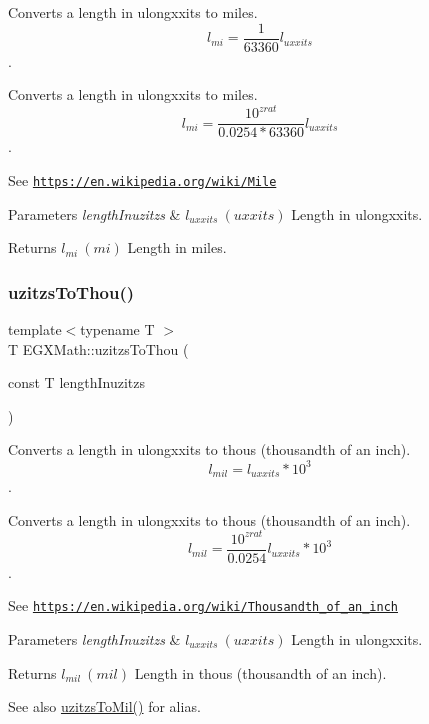 Converts a length in ulongxxits to miles. \[ l_{mi}=\frac{1}{63360} l_{uxxits} \]. 

Converts a length in ulongxxits to miles. \[ l_{mi}=\frac{10^{zrat}}{0.0254 * 63360} l_{uxxits} \].

See \href{https://en.wikipedia.org/wiki/Mile}{\tt https\+://en.\+wikipedia.\+org/wiki/\+Mile} 
\begin{DoxyParams}{Parameters}
{\em length\+Inuzitzs} & $ l_{uxxits}\ (uxxits)$ Length in ulongxxits. \\
\hline
\end{DoxyParams}
\begin{DoxyReturn}{Returns}
$ l_{mi}\ (mi)$ Length in miles. 
\end{DoxyReturn}
\mbox{\label{group___e_g_x_math-_conversions-_length_conversions-uzitzs-_imperial_gaa11694f9026bf30e29bd716a35c05b4e}} 
\subsubsection{\texorpdfstring{uzitzs\+To\+Thou()}{uzitzsToThou()}}
{\footnotesize\ttfamily template$<$typename T $>$ \\
T E\+G\+X\+Math\+::uzitzs\+To\+Thou (\begin{DoxyParamCaption}\item[{const T}]{length\+Inuzitzs }\end{DoxyParamCaption})}



Converts a length in ulongxxits to thous (thousandth of an inch). \[ l_{mil}=l_{uxxits} * 10^{3} \]. 

Converts a length in ulongxxits to thous (thousandth of an inch). \[ l_{mil}= \frac{10^{zrat}}{0.0254} l_{uxxits} * 10^{3} \].

See \href{https://en.wikipedia.org/wiki/Thousandth_of_an_inch}{\tt https\+://en.\+wikipedia.\+org/wiki/\+Thousandth\+\_\+of\+\_\+an\+\_\+inch} 
\begin{DoxyParams}{Parameters}
{\em length\+Inuzitzs} & $ l_{uxxits}\ (uxxits)$ Length in ulongxxits. \\
\hline
\end{DoxyParams}
\begin{DoxyReturn}{Returns}
$ l_{mil}\ (mil)$ Length in thous (thousandth of an inch). 
\end{DoxyReturn}
\begin{DoxySeeAlso}{See also}
\mbox{\hyperlink{group___e_g_x_math-_conversions-_length_conversions-uzitzs-_imperial_ga53d4abecb2e7ac39c15c4ef89b9447a9}{uzitzs\+To\+Mil()}} for alias. 
\end{DoxySeeAlso}
\mbox{\label{group___e_g_x_math-_conversions-_length_conversions-uzitzs-_imperial_ga3281bb64c81bc68a166a47ccc1f9a146}} 
